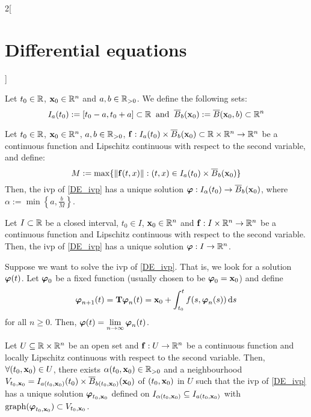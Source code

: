 \documentclass[../../../main.tex]{subfiles}
\begin{document}
\begin{multicols}{2}[\section{Differential equations}]
\begin{corollary}
  \end{corollary}
  \begin{definition}
    Let $t_0\in\mathbb{R}$, $\boldsymbol{\mathrm{x}}_0\in\mathbb{R}^n$ and $a,b\in\mathbb{R}_{>0}$. We define the following sets: $$I_a(t_0):=[t_0-a,t_0+a]\subset\mathbb{R}\;\;\text{and}\;\;\overline{B}_{b}(\boldsymbol{\mathrm{x}}_0):=\overline{B}(\boldsymbol{\mathrm{x}}_0,b)\subset\mathbb{R}^n$$
  \end{definition}
  \begin{theorem}\label{DE_picard}
    Let $t_0\in\mathbb{R}$, $\boldsymbol{\mathrm{x}}_0\in\mathbb{R}^n$, $a,b\in\mathbb{R}_{>0}$, $\boldsymbol{\mathrm{f}}:I_a(t_0)\times\overline{B}_{b}(\boldsymbol{\mathrm{x}}_0)\subset\mathbb{R}\times\mathbb{R}^n\rightarrow\mathbb{R}^n$ be a continuous function and Lipschitz continuous with respect to the second variable, and define: $$M:=\max\{\|\boldsymbol{\mathrm{f}}(t,x)\|:(t,x)\in I_a(t_0)\times\overline{B}_{b}(\boldsymbol{\mathrm{x}}_0)\}$$ Then, the ivp of \cref{DE_ivp} has a unique solution $\boldsymbol{\mathrm{\varphi}}:I_\alpha(t_0)\rightarrow\overline{B}_{b}(\boldsymbol{\mathrm{x}}_0)$, where $\alpha:=\min\left\{a,\frac{b}{M}\right\}$.
  \end{theorem}
  \begin{corollary}
    Let $I\subset \mathbb{R}$ be a closed interval, $t_0\in I$, $\boldsymbol{\mathrm{x}}_0\in\mathbb{R}^n$ and $\boldsymbol{\mathrm{f}}:I\times\mathbb{R}^n\rightarrow\mathbb{R}^n$ be a continuous function and Lipschitz continuous with respect to the second variable. Then, the ivp of \cref{DE_ivp} has a unique solution $\boldsymbol{\mathrm{\varphi}}:I\rightarrow\mathbb{R}^n$.
  \end{corollary}
  \begin{corollary}
    Suppose we want to solve the ivp of \cref{DE_ivp}. That is, we look for a solution $\boldsymbol{\mathrm{\varphi}}(t)$. Let $\boldsymbol{\mathrm{\varphi}}_0$ be a fixed function (usually chosen to be $\boldsymbol{\mathrm{\varphi}}_0=\boldsymbol{\mathrm{x}}_0$) and define
    $$\boldsymbol{\mathrm{\varphi}}_{n+1}(t)=\boldsymbol{\mathrm{T}}\boldsymbol{\mathrm{\varphi}}_n(t)=\boldsymbol{\mathrm{x}}_0+\int_{t_0}^tf(s,\boldsymbol{\mathrm{\varphi}}_n(s))\dd{s}$$
    for all $n\geq 0$. Then, $\displaystyle\boldsymbol{\mathrm{\varphi}}(t)=\lim_{n\to\infty}\boldsymbol{\mathrm{\varphi}}_n(t)$.
  \end{corollary}
  \begin{corollary}
    Let $U\subseteq\mathbb{R}\times\mathbb{R}^n$ be an open set and $\boldsymbol{\mathrm{f}}:U\rightarrow\mathbb{R}^n$ be a continuous function and locally Lipschitz continuous with respect to the second variable. Then, $\forall(t_0,\boldsymbol{\mathrm{x}}_0)\in U$, there exists $\alpha(t_0,\boldsymbol{\mathrm{x}}_0)\in\mathbb{R}_{>0}$ and a neighbourhood $V_{t_0,\boldsymbol{\mathrm{x}}_0}=I_{a(t_0,\boldsymbol{\mathrm{x}}_0)}(t_0)\times\overline{B}_{b(t_0,\boldsymbol{\mathrm{x}}_0)}(\boldsymbol{\mathrm{x}}_0)$ of $(t_0,\boldsymbol{\mathrm{x}}_0)$ in $U$ such that the ivp of \cref{DE_ivp} has a unique solution $\boldsymbol{\mathrm{\varphi}}_{t_0,\boldsymbol{\mathrm{x}}_0}$ defined on $I_{\alpha(t_0,\boldsymbol{\mathrm{x}}_0)}\subseteq I_{a(t_0,\boldsymbol{\mathrm{x}}_0)}$ with $\operatorname{graph}(\boldsymbol{\mathrm{\varphi}}_{t_0,\boldsymbol{\mathrm{x}}_0})\subset V_{t_0,\boldsymbol{\mathrm{x}}_0}$.

\end{corollary}
\end{multicols}
\end{document}
